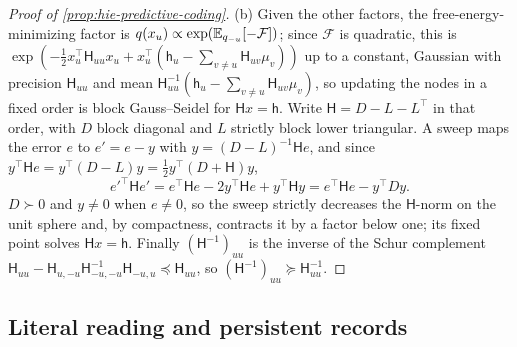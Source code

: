 \begin{proof}[Proof of \cref{prop:hie-predictive-coding}]
(b) Given the other factors, the free-energy-minimizing factor is $q(x_u)\propto\exp(\mathbb{E}_{q_{-u}}[-\mathcal F])$; since $\mathcal F$ is quadratic, this is $\exp(-\frac12x_u^\top\mathsf H_{uu}x_u+x_u^\top(\mathsf h_u-\sum_{v\neq u}\mathsf H_{uv}\mu_v))$ up to a constant, Gaussian with precision $\mathsf H_{uu}$ and mean $\mathsf H_{uu}^{-1}(\mathsf h_u-\sum_{v\neq u}\mathsf H_{uv}\mu_v)$, so updating the nodes in a fixed order is block Gauss--Seidel for $\mathsf Hx=\mathsf h$. Write $\mathsf H=D-L-L^\top$ in that order, with $D$ block diagonal and $L$ strictly block lower triangular. A sweep maps the error $e$ to $e'=e-y$ with $y=(D-L)^{-1}\mathsf He$, and since $y^\top\mathsf He=y^\top(D-L)y=\frac12y^\top(D+\mathsf H)y$,
\[
e'^\top\mathsf He'=e^\top\mathsf He-2y^\top\mathsf He+y^\top\mathsf Hy=e^\top\mathsf He-y^\top Dy.
\]
$D\succ0$ and $y\neq0$ when $e\neq0$, so the sweep strictly decreases the $\mathsf H$-norm on the unit sphere and, by compactness, contracts it by a factor below one; its fixed point solves $\mathsf Hx=\mathsf h$. Finally $(\mathsf H^{-1})_{uu}$ is the inverse of the Schur complement $\mathsf H_{uu}-\mathsf H_{u,-u}\mathsf H_{-u,-u}^{-1}\mathsf H_{-u,u}\preceq\mathsf H_{uu}$, so $(\mathsf H^{-1})_{uu}\succeq\mathsf H_{uu}^{-1}$.
\end{proof}

\subsection*{Literal reading and persistent records}

